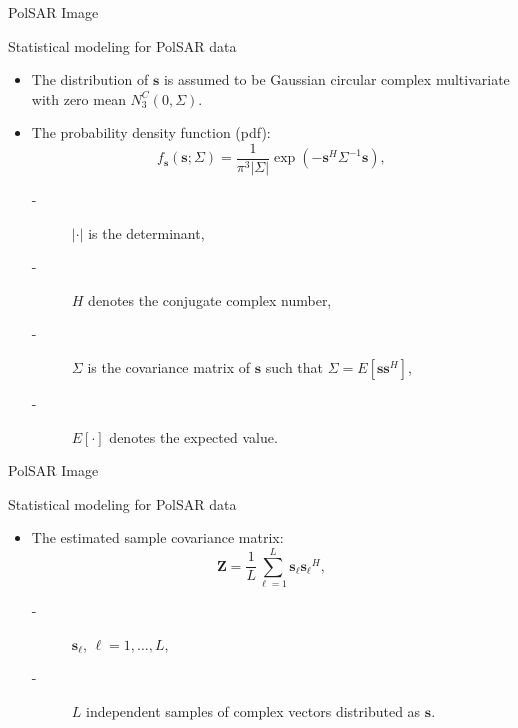 \documentclass[10pt]{beamer}
\begin{document}
\begin{frame}[fragile]{PolSAR Image}
\begin{alertblock}{Statistical modeling for PolSAR data}
\begin{itemize}
\item The distribution of $\mathbf{s}$ is assumed to be  Gaussian circular complex multivariate with zero mean $N^{C}_3(0,\Sigma)$.
\item The probability density function (pdf):
\begin{equation}
    f_{\mathbf{s}}(\mathbf{s};\Sigma)=\frac{1}{\pi^3|\Sigma|} \exp(-\mathbf{s}^H\Sigma^{-1}\mathbf{s}),
    \label{eq_02}
\end{equation}
        \begin{description}
        \item[-] $|\cdot|$ is the determinant, 
        \item[-] $H$ denotes the conjugate complex number, 
        \item[-] $\Sigma$ is the covariance matrix of $\mathbf{s}$ such that $\Sigma=E[\mathbf{ss}^H]$,
        \item[-] $E[\cdot]$ denotes the expected value. 
        \end{description}
\end{itemize}
\end{alertblock}
\end{frame}
%
\begin{frame}[fragile]{PolSAR Image}
\begin{alertblock}{Statistical modeling for PolSAR data}
\begin{itemize}
\item The estimated sample covariance matrix:
\begin{equation}
    \mathbf{Z}=\frac{1}{L}\sum_{\ell=1}^{L} {\mathbf{s}_\ell}{\mathbf{s}_\ell}^H,
    \label{eq_03}
\end{equation}
\begin{description}
      \item[-] $\mathbf{s}_\ell$, $\ell = 1, \dots, L$,
      \item[-] $L$ independent samples of complex vectors distributed as $\mathbf{s}$. 
\end{description}
\end{itemize}
\end{alertblock}
\end{frame}
\end{document}
